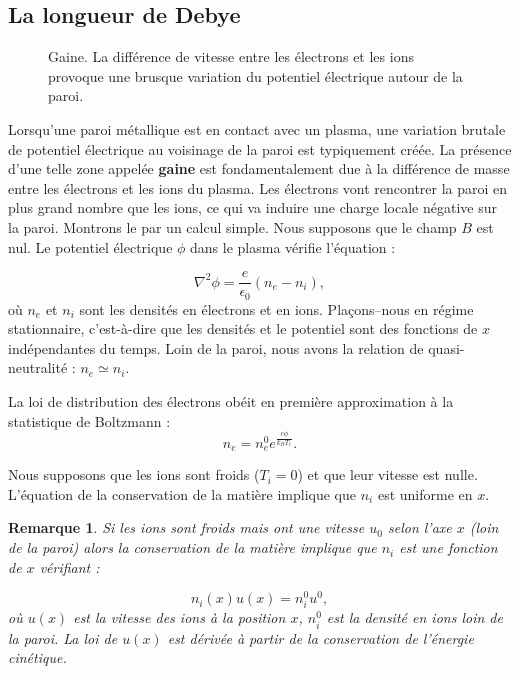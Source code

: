 \documentclass{book}
\newtheorem{rem}{Remarque}[chapter]
\begin{document}
\subsection{La longueur de Debye}\label{sectiondebye}


\begin{figure}[htb]
 \centerline{}   
 \caption{Gaine. La diff\'erence de vitesse entre les \'electrons et les
ions provoque une brusque variation du potentiel \'electrique autour de
la paroi.}
 \label{gaine}
\end{figure}
%
%
Lorsqu'une paroi m\'etallique est en
contact avec un plasma, 
une variation brutale de potentiel \'electrique au voisinage 
de la paroi est typiquement cr\'e\'ee.
La pr\'esence d'une telle zone appel\'ee {\bf gaine} est
fondamentalement due 
\`a la diff\'erence de masse entre les \'electrons et les ions du plasma.
Les \'electrons vont rencontrer la paroi en plus grand nombre que les
ions, ce qui va induire une charge locale n\'egative sur la paroi.
Montrons le par un calcul simple. Nous supposons que le champ $B$
 est nul.
Le potentiel \'electrique $\phi$ dans le plasma
v\'erifie l'\'equation :

\begin{equation}
\nabla^2 \phi=\frac{e}{\epsilon_0}(n_e- n_i),
\end{equation}
o\`u $n_e$ et $n_i$ sont les densit\'es en \'electrons et en ions.
Pla\c cons--nous en r\'egime stationnaire, c'est-\`a-dire que les
densit\'es 
et le potentiel sont des fonctions de $x$ ind\'ependantes du temps.
Loin de la paroi, nous avons la relation de quasi-neutralit\'e :
$n_e\simeq n_i$.

La loi de distribution des \'electrons ob\'eit en premi\`ere
approximation \`a 
la statistique de Boltzmann :
\begin{equation}
n_e=n_e^0e^{\frac{e\phi}{k_B T_e}}.
\end{equation}


Nous supposons que les ions sont froids  ($T_i=0$) et que leur vitesse
est nulle. L'\'equation de la conservation 
 de la mati\`ere implique que
$n_i$ est uniforme en $x$.
\begin{rem}
Si les ions sont froids mais ont une vitesse $u_0$ selon l'axe $x$
(loin de la paroi)
alors la conservation de la mati\`ere implique que $n_i$ est une
fonction de $x$ v\'erifiant \cite{Chen84} :

\begin{equation}
n_i(x)u(x)=n_i^0u^0,
\end{equation}
o\`u $u(x)$ est la vitesse des ions \`a la position $x$, $n_i^0$ est la
densit\'e en ions loin de la paroi.
La loi de $u(x)$ est d\'eriv\'ee \`a partir de la conservation de l'\'energie
cin\'etique.
\end{rem}
\end{document}
